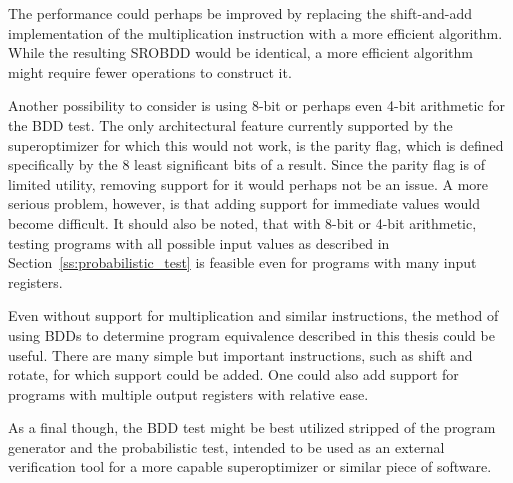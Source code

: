 \documentclass[a4paper,11pt]{kth-mag}
\begin{document}
The performance could perhaps be improved by replacing the shift-and-add implementation of the multiplication instruction with a more efficient algorithm.
While the resulting SROBDD would be identical, a more efficient algorithm might require fewer operations to construct it.

Another possibility to consider is using 8-bit or perhaps even 4-bit arithmetic for the BDD test.
The only architectural feature currently supported by the superoptimizer for which this would not work, is the parity flag, which is defined specifically by the 8 least significant bits of a result.
Since the parity flag is of limited utility, removing support for it would perhaps not be an issue.
A more serious problem, however, is that adding support for immediate values would become difficult.
It should also be noted, that with 8-bit or 4-bit arithmetic, testing programs with all possible input values as described in Section~\ref{ss:probabilistic_test} is feasible even for programs with many input registers.

Even without support for multiplication and similar instructions, the method of using BDDs to determine program equivalence described in this thesis could be useful.
There are many simple but important instructions, such as shift and rotate, for which support could be added.
One could also add support for programs with multiple output registers with relative ease.

As a final though, the BDD test might be best utilized stripped of the program generator and the probabilistic test, intended to be used as an external verification tool for a more capable superoptimizer or similar piece of software.



\end{document}
